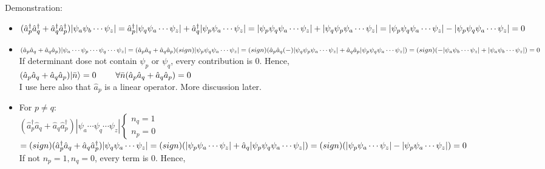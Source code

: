 \documentclass[a4paper, 12pt]{article}
\begin{document}
Demonstration: 
\begin{itemize}
	\item $(\hat{a}_p^\dagger \hat{a}_q^\dagger + \hat{a}_q^\dagger \hat{a}_p^\dagger) |\psi_a\psi_b\cdots\psi_z| \\
	= \hat{a}_p^\dagger|\psi_q\psi_a\cdots\psi_z|+\hat{a}_q^\dagger |\psi_p\psi_a\cdots\psi_z| \\
	= |\psi_p \psi_q\psi_a\cdots\psi_z|+|\psi_q \psi_p\psi_a\cdots\psi_z| \\
	= |\psi_p \psi_q\psi_a\cdots\psi_z|-|\psi_p \psi_q\psi_a\cdots\psi_z| \\
	=0 $
	\item $ (\hat{a}_p \hat{a}_q+ \hat{a}_q\hat{a}_p ) |\psi_a\cdots \psi_p\cdots\psi_q \cdots \psi_z| \\
	= (\hat{a}_p \hat{a}_q+ \hat{a}_q\hat{a}_p) (sign)|\psi_p \psi_q\psi_a\cdots\psi_z|\\
	=(sign) (\hat{a}_p \hat{a}_q (-) |\psi_q \psi_p\psi_a\cdots\psi_z|+\hat{a}_q\hat{a}_p |\psi_p \psi_q\psi_a\cdots\psi_z| )\\
	=(sign)(-|\psi_a\psi_b\cdots\psi_z|+|\psi_a\psi_b\cdots\psi_z|)\\
	=0  $\\
	If determinant dose not contain $\psi_p$ or $\psi_q$, every contribution is 0.  Hence,\\
	$(\hat{a}_p \hat{a}_q+ \hat{a}_q\hat{a}_p)|\bar{n}\rangle = 0 \hspace*{0.8cm} \forall \bar{n}\\
	(\hat{a}_p \hat{a}_q+ \hat{a}_q\hat{a}_p)=0$\\
	I use here also that $\hat{a}_p$ is a linear operator. More discussion later.
	\item For $p\neq q$:\\
	$ (\hat{a}_p^\dagger \hat{a}_q+ \hat{a}_q \hat{a}_p^\dagger )|\psi_a\cdots \psi_q\cdots \psi_z | \left\{ \begin{array}{rcl}
        n_q=1 \\
        n_p=0 
           \end{array}\right. $\\
    $ = (sign)(\hat{a}_p^\dagger \hat{a}_q+ \hat{a}_q \hat{a}_p^\dagger)|\psi_q\psi_a\cdots  \psi_z | \\
    = (sign)(|\psi_p \psi_a\cdots\psi_z |+\hat{a}_q|\psi_p \psi_q\psi_a\cdots\psi_z| )\\
    = (sign)( |\psi_p \psi_a\cdots\psi_z |- |\psi_p \psi_a\cdots\psi_z|)\\
    =0 $\\
    If not $n_p=1, n_q=0 $, every term is 0. Hence,\\

\end{itemize}
\end{document}
